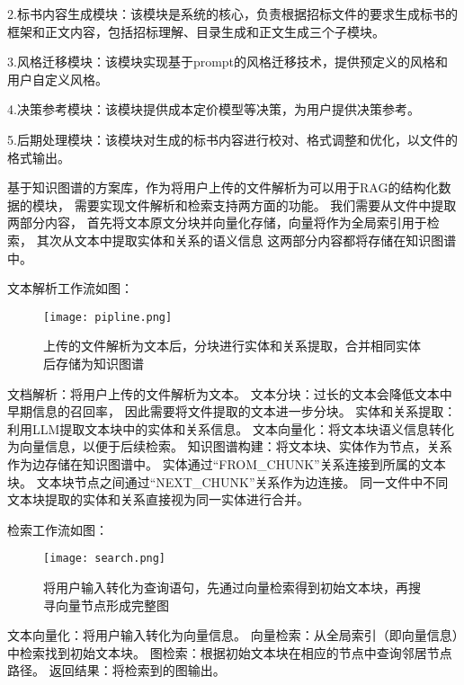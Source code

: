 \documentclass{xmu}
\begin{document}
2.标书内容生成模块：该模块是系统的核心，负责根据招标文件的要求生成标书的框架和正文内容，包括招标理解、目录生成和正文生成三个子模块。

3.风格迁移模块：该模块实现基于prompt的风格迁移技术，提供预定义的风格和用户自定义风格。

4.决策参考模块：该模块提供成本定价模型等决策，为用户提供决策参考。

5.后期处理模块：该模块对生成的标书内容进行校对、格式调整和优化，以文件的格式输出。


基于知识图谱的方案库，作为将用户上传的文件解析为可以用于RAG的结构化数据的模块，
需要实现文件解析和检索支持两方面的功能。
我们需要从文件中提取两部分内容，
首先将文本原文分块并向量化存储，向量将作为全局索引用于检索，
其次从文本中提取实体和关系的语义信息
这两部分内容都将存储在知识图谱中。

文本解析工作流如图：

\begin{figure}[!htb]
    \centering
    \texttt{[image: pipline.png]}\\
    \caption{上传的文件解析为文本后，分块进行实体和关系提取，合并相同实体后存储为知识图谱}\label{wenbwenjiexi}
\end{figure}

文档解析：将用户上传的文件解析为文本。
文本分块：过长的文本会降低文本中早期信息的召回率\cite{Long}，
因此需要将文件提取的文本进一步分块。
实体和关系提取：利用LLM提取文本块中的实体和关系信息。
文本向量化：将文本块语义信息转化为向量信息，以便于后续检索。
知识图谱构建：将文本块、实体作为节点，关系作为边存储在知识图谱中。
实体通过“FROM\_CHUNK”关系连接到所属的文本块。
文本块节点之间通过“NEXT\_CHUNK”关系作为边连接。
同一文件中不同文本块提取的实体和关系直接视为同一实体进行合并。

检索工作流如图：

\begin{figure}[!htb]
    \centering
    \texttt{[image: search.png]}\\
    \caption{将用户输入转化为查询语句，先通过向量检索得到初始文本块，再搜寻向量节点形成完整图}\label{jiansuo}
\end{figure}

文本向量化：将用户输入转化为向量信息。
向量检索：从全局索引（即向量信息）中检索找到初始文本块。
图检索：根据初始文本块在相应的节点中查询邻居节点路径。
返回结果：将检索到的图输出。
\end{document}
